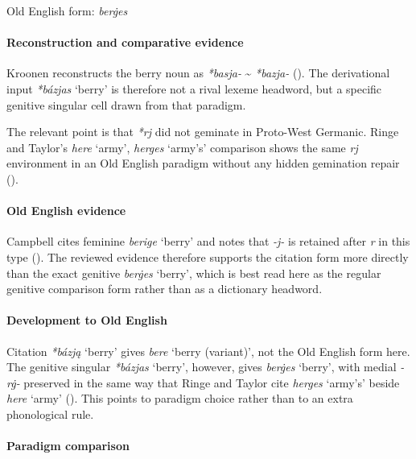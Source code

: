 \documentclass[
  british,
  a4paper,
]{article}
\providecommand{\Recon}[1]{\emph{*#1}}
\begin{document}
Old English form: \emph{berġes}

\paragraph{Reconstruction and comparative
evidence}\label{reconstruction-and-comparative-evidence-118}

Kroonen reconstructs the berry noun as {\emph{*basja-}}
\textasciitilde{} {\emph{*bazja-}} (). The derivational input \Recon{bázjas} `berry' is therefore
not a rival lexeme headword, but a specific genitive singular cell drawn
from that paradigm.

The relevant point is that \emph{*rj} did not geminate in Proto-West
Germanic. Ringe and Taylor's {\emph{here}} `army', {\emph{herges}}
`army's' comparison shows the same \emph{rj} environment in an Old
English paradigm without any hidden gemination repair
().

\paragraph{Old English evidence}\label{old-english-evidence-118}

Campbell cites feminine {\emph{berige}} `berry' and notes that
\emph{-j-} is retained after \emph{r} in this type
(). The reviewed evidence
therefore supports the citation form more directly than the exact
genitive {\emph{berġes}} `berry', which is best read here as the regular
genitive comparison form rather than as a dictionary headword.

\paragraph{Development to Old
English}\label{development-to-old-english-118}

Citation \Recon{bázją} `berry' gives {\emph{bere}} `berry (variant)',
not the Old English form here. The genitive singular \Recon{bázjas}
`berry', however, gives {\emph{berġes}} `berry', with medial \emph{-rġ-}
preserved in the same way that Ringe and Taylor cite {\emph{herges}}
`army's' beside {\emph{here}} `army'
(). This
points to paradigm choice rather than to an extra phonological rule.

\paragraph{Paradigm comparison}\label{paradigm-comparison-1}
\end{document}

